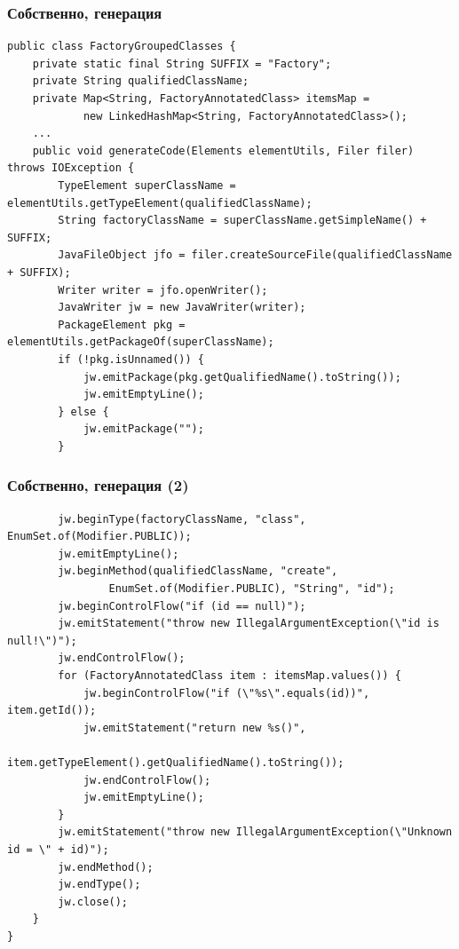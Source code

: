 \documentclass[xetex,mathserif,serif]{beamer}
\begin{document}
	\begin{frame}[fragile]
		\frametitle{Собственно, генерация}
		\begin{footnotesize}
			\begin{verbatim}
public class FactoryGroupedClasses {
    private static final String SUFFIX = "Factory";
    private String qualifiedClassName;
    private Map<String, FactoryAnnotatedClass> itemsMap =
            new LinkedHashMap<String, FactoryAnnotatedClass>();
    ...
    public void generateCode(Elements elementUtils, Filer filer) throws IOException {
        TypeElement superClassName = elementUtils.getTypeElement(qualifiedClassName);
        String factoryClassName = superClassName.getSimpleName() + SUFFIX;
        JavaFileObject jfo = filer.createSourceFile(qualifiedClassName + SUFFIX);
        Writer writer = jfo.openWriter();
        JavaWriter jw = new JavaWriter(writer);
        PackageElement pkg = elementUtils.getPackageOf(superClassName);
        if (!pkg.isUnnamed()) {
            jw.emitPackage(pkg.getQualifiedName().toString());
            jw.emitEmptyLine();
        } else {
            jw.emitPackage("");
        }
			\end{verbatim}
		\end{footnotesize}
\end{frame}

	\begin{frame}[fragile]
		\frametitle{Собственно, генерация (2)}
		\begin{footnotesize}
			\begin{verbatim}
        jw.beginType(factoryClassName, "class", EnumSet.of(Modifier.PUBLIC));
        jw.emitEmptyLine();
        jw.beginMethod(qualifiedClassName, "create", 
                EnumSet.of(Modifier.PUBLIC), "String", "id");
        jw.beginControlFlow("if (id == null)");
        jw.emitStatement("throw new IllegalArgumentException(\"id is null!\")");
        jw.endControlFlow();
        for (FactoryAnnotatedClass item : itemsMap.values()) {
            jw.beginControlFlow("if (\"%s\".equals(id))", item.getId());
            jw.emitStatement("return new %s()", 
                    item.getTypeElement().getQualifiedName().toString());
            jw.endControlFlow();
            jw.emitEmptyLine();
        }
        jw.emitStatement("throw new IllegalArgumentException(\"Unknown id = \" + id)");
        jw.endMethod();
        jw.endType();
        jw.close();
    }
}
			\end{verbatim}
		\end{footnotesize}
\end{frame}
\end{document}
